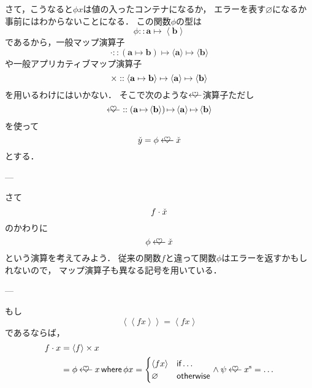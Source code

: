 \documentclass[a4paper,draft]{jsbook}
\newcommand{\mListVar}[1]{{#1}^\mathrm{s}}
\DeclareMathOperator{\mMapsTo}{\mapsto}
\newcommand{\mathTypeParameter}[1]{\mathbf{#1}}
\newcommand{\mathContainerVar}[1]{\Check{#1}}
\newcommand{\mathPureWith}[1]{\left\langle#1\right\rangle}
\newcommand{\mathUnitWith}[1]{\left\langle\!\left\langle#1\right\rangle\!\right\rangle}
\newcommand{\mathPureType}[1]{\mathPureWith{\mathTypeParameter{#1}}}
\newcommand{\mathPureNothing}{\varnothing}
\newcommand{\mathAnd}{\mathbin{\wedge}}
\newcommand{\mathApplicativeGeneralMap}{\mathbin{\times}}
\newcommand{\mathBind}{\mathbin{\ooalign{$\longleftarrow$\crcr\hss$\heartsuit$\hss}}}
\newcommand{\mathGeneralMap}{\mathbin{\cdot}}
\newcommand{\mathIn}{\mathrel{::}}
\newcommand{\mathMapsTo}{\mapsto}
\newcommand{\mathKeyword}[1]{\operatorname{\textsf{#1}}}
\newcommand{\mathIf}{\mathKeyword{if}}
\newcommand{\mathOtherwise}{\mathKeyword{otherwise}}
\newcommand{\mathWhere}{\mathKeyword{where}}
\newcommand{\mathMorph}[2]{#1\mathMapsTo#2}
\newcommand{\mathMorphII}[3]{#1\mathMapsTo#2\mathMapsTo#3}
\begin{document}
さて，こうなると$\phi x$は値の入ったコンテナになるか，
エラーを表す$\mathPureNothing$になるか事前にはわからないことになる．
この関数$\phi$の型は
\begin{equation}
  \phi\mathIn\mathTypeParameter{a}\mMapsTo\mathPureWith{\mathTypeParameter{b}}
\end{equation}
であるから，一般マップ演算子
\begin{equation}
\mathGeneralMap
\mathIn{}\mathMorphII{(\mathMorph{\mathTypeParameter{a}}{\mathTypeParameter{b}})}{\langle\mathTypeParameter{a}\rangle}{\langle\mathTypeParameter{b}\rangle}
\end{equation}
や一般アプリカティブマップ演算子
\begin{equation}
\mathApplicativeGeneralMap
\mathIn{}\mathMorphII{\langle\mathMorph{\mathTypeParameter{a}}{\mathTypeParameter{b}}\rangle}{\langle\mathTypeParameter{a}\rangle}{\langle\mathTypeParameter{b}\rangle}\\
\end{equation}
を用いるわけにはいかない．
そこで次のような$\mathBind$演算子ただし
\begin{equation}
\mathBind
\mathIn
\left(\mathTypeParameter{a}\mMapsTo\mathPureType{b}\right)
\mMapsTo
\mathPureType{a}
\mMapsTo
\mathPureType{b}
\end{equation}
を使って
\begin{equation}
  \mathContainerVar{y}=\phi\mathBind\mathContainerVar{x}
\end{equation}
とする．

---

さて
\begin{equation}
  f\mathGeneralMap\mathContainerVar{x}
\end{equation}
のかわりに
\begin{equation}
  \phi\mathBind\mathContainerVar{x}
\end{equation}
という演算を考えてみよう．
従来の関数$f$と違って関数$\phi$はエラーを返すかもしれないので，
マップ演算子も異なる記号を用いている．

---

もし
\begin{equation}
\mathUnitWith{fx}=\mathPureWith{fx}
\end{equation}
であるならば，
\begin{align}
f\mathGeneralMap x&=\mathPureWith{f}\mathApplicativeGeneralMap x\\
&=\phi\mathBind x\mathWhere \phi x=\begin{cases}
\mathPureWith{fx}&\mathIf\dots\\
\mathPureNothing&\mathOtherwise
\end{cases}
\mathAnd
\psi\mathBind\mListVar{x}=\dots
\end{align}
\end{document}
